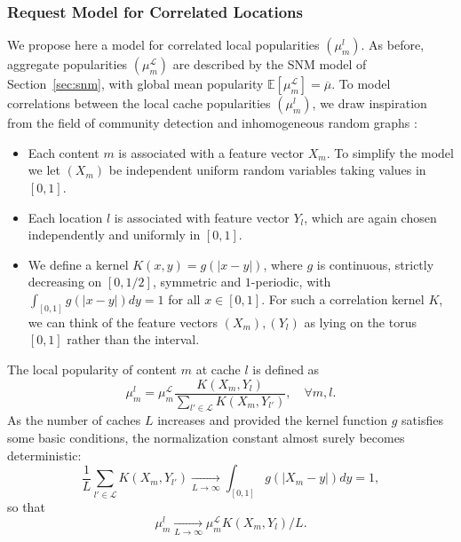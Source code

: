 \documentclass[10pt, conference, letterpaper]{IEEEtran}
\newcommand{\mean}[1]{\mathbb{E}\!\left[#1\right]}
\def\Lcal{\mathcal{L}}
\begin{document}
\subsubsection{Request Model for Correlated Locations}

We propose here a model for correlated local popularities $(\mu_m^l)$. 
As before, aggregate popularities $(\mu_m^\mathcal L)$ are described by the SNM model of Section~\ref{sec:snm}, with global mean popularity $\mean{\mu_m^\mathcal L}=\overline\mu$.
To model correlations between the local cache popularities $(\mu_m^l)$, we draw inspiration from the field of community detection \cite{lelarge2013reconstruction} and inhomogeneous random graphs \cite{bollobas2007phase}:
\begin{itemize}
\item Each content $m$ is associated with a feature vector $X_m$. To simplify the model we let $(X_m)$ be independent uniform random variables taking values in $[0,1]$. 

\item Each location $l$ is associated with feature vector $Y_l$, which are again chosen independently and uniformly in $[0,1]$.

\item We define a kernel $K(x,y)=g(|x-y|)$, where $g$ is continuous, strictly decreasing on $[0,1/2]$, symmetric and $1$-periodic, with $\int_{[0,1]}g(|x-y|)dy=1$ for all $x\in[0,1]$. For such a correlation kernel $K$, we can think of the feature vectors $(X_m),(Y_l)$ as lying on the torus $[0,1]$ rather than the interval.
\end{itemize}
The local popularity of content $m$ at cache $l$ is defined as 
\begin{equation*}\mu_m^l=\mu_m^\mathcal L\frac{K(X_m,Y_l)}{\sum_{l'\in\Lcal}K(X_m,Y_{l'})},\quad \forall m,l. \end{equation*}
As the number of caches $L$ increases and provided the kernel function $g$ satisfies some basic conditions, the normalization constant almost surely becomes deterministic: 
\[\frac1L\sum_{l'\in\Lcal}K(X_m,Y_{l'})\underset{L\to\infty}\to\int_{[0,1]}g(|X_m-y|)dy=1,\] 
so that 
\begin{equation}\label{eqn: limit local pop}
\mu_m^l\underset{L\to\infty}\to \mu_m^\mathcal L K(X_m,Y_l)/L.
\end{equation}
\end{document}
